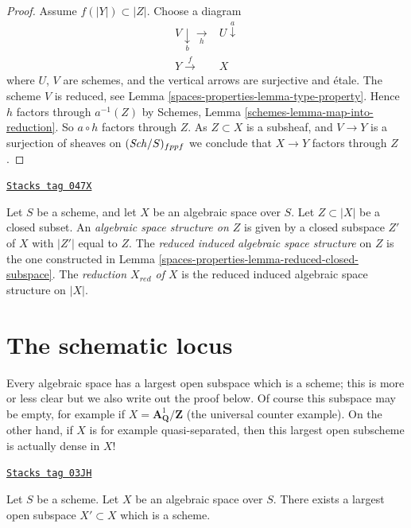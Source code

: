 \begin{proof}
Assume $f(|Y|) \subset |Z|$. Choose a diagram
$$
\begin{array}{cc}V \underset{b}{\downarrow}\underset{h}{\longrightarrow} & U \overset{a}{\downarrow} \\ Y \overset{f}{\longrightarrow} & X\end{array}
$$
where $U$, $V$ are schemes, and the vertical arrows are surjective and
\'etale. The scheme $V$ is reduced, see
Lemma \ref{spaces-properties-lemma-type-property}.
Hence $h$ factors through $a^{-1}(Z)$ by
Schemes, Lemma \ref{schemes-lemma-map-into-reduction}.
So $a \circ h$ factors through $Z$.
As $Z \subset X$ is a subsheaf, and $V \to Y$ is a surjection of sheaves
on $(\mathit{Sch}/S)_{fppf}$ we conclude that $X \to Y$ factors
through $Z$.
\end{proof}

\begin{definition}
\label{spaces-properties-definition-reduced-induced-space}
\href{https://stacks.math.columbia.edu/tag/047X}{\texttt{Stacks tag 047X}}

Let $S$ be a scheme, and let $X$ be an algebraic space over $S$.
Let $Z \subset |X|$ be a closed subset.
An {\it algebraic space structure on $Z$} is given by a closed subspace
$Z'$ of $X$ with $|Z'|$ equal to $Z$.
The {\it reduced induced algebraic space structure}
on $Z$ is the one constructed in
Lemma \ref{spaces-properties-lemma-reduced-closed-subspace}.
The {\it reduction $X_{red}$ of $X$} is the reduced induced algebraic
space structure on $|X|$.
\end{definition}

\section{The schematic locus}
\label{spaces-properties-section-schematic}
Every algebraic space has a largest open subspace which is a
scheme; this is more or less clear but we also write out the proof below.
Of course this subspace may be empty, for example if
$X = \mathbf{A}^1_{\mathbf{Q}}/\mathbf{Z}$ (the universal
counter example). On the other hand, if $X$ is for example quasi-separated,
then this largest open subscheme is actually dense in $X$!

\begin{lemma}[Subscheme]
\label{spaces-properties-lemma-subscheme}
\href{https://stacks.math.columbia.edu/tag/03JH}{\texttt{Stacks tag 03JH}}

Let $S$ be a scheme.
Let $X$ be an algebraic space over $S$.
There exists a largest open subspace $X' \subset X$ which is a scheme.
\end{lemma}

